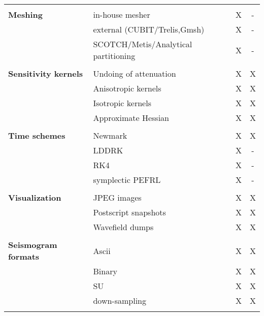 \begin{table}[htp]
\begin{center}
\begin{tabular}{ l l c c}
\hline
& & & \\
{\bf Meshing}           & in-house mesher                       & X  & - \\
                        & external (CUBIT/Trelis,Gmsh)          & X  & - \\
                        & SCOTCH/Metis/Analytical partitioning  & X  & - \\
\hline
& & & \\
{\bf Sensitivity kernels} & Undoing of attenuation          & X  & X \\
                          & Anisotropic kernels             & X  & X \\
                          & Isotropic kernels               & X  & X \\
                          & Approximate Hessian             & X  & X \\
\hline
& & & \\
{\bf Time schemes}  & Newmark           & X  & X \\
                    & LDDRK             & X  & - \\
                    & RK4               & X  & - \\
                    & symplectic PEFRL  & X  & - \\
\hline
& & & \\
{\bf Visualization} & JPEG images          & X  & X \\
                    & Postscript snapshots & X  & X \\
                    & Wavefield dumps      & X  & X \\
\hline
& & & \\
{\bf Seismogram formats}  & Ascii          & X  & X \\
                          & Binary         & X  & X \\
                          & SU             & X  & X \\
                          & down-sampling  & X  & X \\
%
\hline
& & & \\ %
\end{tabular}
\end{center}
\end{table}


